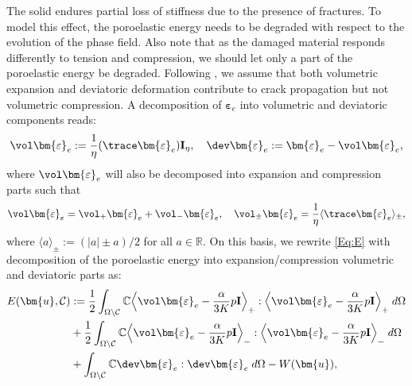 The solid endures partial loss of stiffness due to the presence of fractures. To model this effect, the poroelastic energy needs to be degraded with respect to the evolution of the phase field. Also note that as the damaged material responds differently to tension and compression, we should let only a part of the poroelastic energy be degraded. Following \cite{amor2009regularized}, we assume that both volumetric expansion and deviatoric deformation contribute to crack propagation but not volumetric compression. 
A decomposition of $\bm{\varepsilon}_e$ into volumetric and deviatoric components reads:
\begin{equation}
	\begin{aligned}
		\vol\bm{\varepsilon}_e := \frac{1}{\eta} (\trace\bm{\varepsilon}_e) \mathbf{I}_{\eta}, \quad
		\dev\bm{\varepsilon}_e := \bm{\varepsilon}_e - \vol\bm{\varepsilon}_e,
	\end{aligned}
\end{equation}
where $\vol\bm{\varepsilon}_e$ will also be decomposed into expansion and compression parts such that
\begin{equation}
	\begin{aligned}
		\vol\bm{\varepsilon}_e=\vol_+\bm{\varepsilon}_e+\vol_-\bm{\varepsilon}_e, \quad \vol_{\pm}\bm{\varepsilon}_e=\frac{1}{\eta}\langle \trace \bm{\varepsilon}_e \rangle_{\pm},
	\end{aligned}
\end{equation}
where $\langle a\rangle_\pm:=\left(|a|\pm a\right)/2$ for all $a\in\mathbb{R}$.
On this basis, we rewrite \eqref{Eq:E} with decomposition of the poroelastic energy into expansion/compression volumetric and deviatoric parts as:
\begin{equation*}\label{Eq:E_Amor}
	\begin{aligned}
		E(\bm{u},\mathcal{C})&:= \frac12 \int_{\Omega\setminus\mathcal{C}} \mathbb{C}\Big\langle\vol\bm{\varepsilon}_e-\frac{\alpha}{3K}p\mathbf{I}\Big\rangle_{+}:\Big\langle\vol\bm{\varepsilon}_e-\frac{\alpha}{3K}p\mathbf{I}\Big\rangle_{+}\; d\Omega \\&+
		\frac12 \int_{\Omega\setminus\mathcal{C}} \mathbb{C}\Big\langle\vol\bm{\varepsilon}_e-\frac{\alpha}{3K}p\mathbf{I}\Big\rangle_{-}:\Big\langle\vol\bm{\varepsilon}_e-\frac{\alpha}{3K}p\mathbf{I}\Big\rangle_{-}\; d\Omega \\&+ \int_{\Omega\setminus\mathcal{C}} \mathbb{C}\dev\bm{\varepsilon}_e:\dev\bm{\varepsilon}_e\; d\Omega - W(\bm{u}),
	\end{aligned}
\end{equation*}
